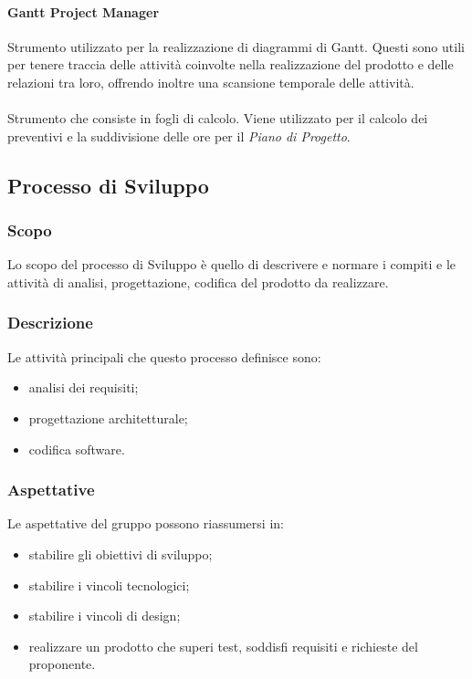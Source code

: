     \paragraph{Gantt Project Manager} \hfill \break
    Strumento utilizzato per la realizzazione di diagrammi di Gantt. Questi sono utili per tenere traccia 
delle attività coinvolte nella realizzazione del prodotto e delle relazioni
    tra loro, offrendo inoltre una scansione temporale delle attività.
\paragraph{  } \hfill \break
Strumento che consiste in fogli di calcolo. Viene utilizzato per il calcolo dei preventivi e la suddivisione delle ore per il \textit{Piano di Progetto}.

\subsection{Processo di Sviluppo}
\subsubsection{Scopo}
Lo scopo del processo di Sviluppo è quello di descrivere e normare i compiti e le attività di analisi, progettazione, codifica del prodotto da realizzare.

\subsubsection{Descrizione}
Le attività principali che questo processo definisce sono:
\begin{itemize}
\item analisi dei requisiti;
\item progettazione architetturale;
\item codifica software.
\end{itemize}
    
\subsubsection{Aspettative}
Le aspettative del gruppo possono riassumersi in:
\begin{itemize}
    \item stabilire gli obiettivi di sviluppo;
    \item stabilire i vincoli tecnologici;
    \item stabilire i vincoli di design;
    \item realizzare un prodotto che superi test, soddisfi requisiti e richieste del proponente.
\end{itemize}

